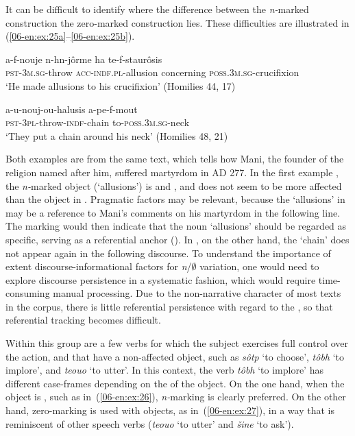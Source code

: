\documentclass[output=paper]{LSP/langsci}
\begin{document}
It can be difficult to identify where the difference between the \textit{n-}marked construction \vs the zero-marked construction lies. These difficulties are illustrated in (\ref{06-en:ex:25a}--\ref{06-en:ex:25b}). 

\begin{exe}
\ex 
\begin{xlist}
\ex \label{06-en:ex:25a}
\gll a-f-nouje 			n-hn-jôr{\ob}me{\cb} 			ha			te-f-staurôsis\\
	\textsc{pst-3m.sg-}throw \textsc{acc-indf.pl-}allusion concerning \textsc{poss.3m.sg-}crucifixion\\%
\glt ‘He made allusions to his crucifixion’ (Homilies 44, 17)

\ex\label{06-en:ex:25b}
\gll a-u-nouj-ou-halu{\ob}sis{\cb} 	a-pe-f-mout\\
	\textsc{pst-3pl-}throw-\textsc{indf-}chain to-\textsc{poss.3m.sg-}neck\\
\glt ‘They put a chain around his neck’ (Homilies 48, 21)

\end{xlist}
\end{exe}


Both examples are from the same text, which tells how Mani, the founder of the religion named after him, suffered martyrdom in AD 277. In the first example , the \textit{n-}marked object (‘allusions’) is  and , and does not seem to be more affected than the object in  . Pragmatic factors may be relevant, because the ‘allusions’ in   may be a reference to Mani’s comments on his martyrdom in the following line. The marking would then indicate that the  noun ‘allusions’ should be regarded as specific, serving as a referential anchor (\cf \citealt{vonHeusinger2002Specificity}). In  , on the other hand, the ‘chain’ does not appear again in the following discourse. To understand the importance of extent discourse-informational factors for \textit{n}/${\emptyset}$ variation, one would need to explore discourse persistence in a systematic fashion, which would require time-consuming manual processing. Due to the non-narrative character of most texts in the corpus, there is little referential persistence with regard to the , so that referential tracking becomes difficult.

Within this group are a few verbs for which the subject exercises full control over the action, and that have a non-affected object, such as \textit{sôtp} ‘to choose’, \textit{tôbh} ‘to implore’, and \textit{teouo} ‘to utter’. In this context, the verb \textit{tôbh} ‘to implore’ has different case-frames depending on the  of the object. On the one hand, when the object is , such as in~(\ref{06-en:ex:26}), \textit{n-}marking is clearly preferred. On the other hand, zero-marking is used with  objects, as in~(\ref{06-en:ex:27}), in a way that is reminiscent of other speech verbs (\cf \textit{teouo} ‘to utter’ and \textit{šine} ‘to ask’).
\end{document}
